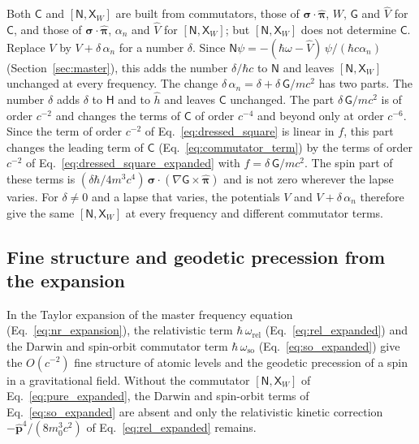 \documentclass[aps,prd,onecolumn,tightenlines,nofootinbib,notitlepage,11pt,floatfix]{revtex4-2}
\theoremstyle{indentedtheorem}
\begin{document}
Both $\mathsf{C}$ and $[\mathsf{N},\mathsf{X}_W]$ are built from commutators, those of $\boldsymbol{\sigma}\cdot\hat{\boldsymbol{\pi}}$, $W$, $\mathsf{G}$ and $\hat{V}$ for $\mathsf{C}$, and those of $\boldsymbol{\sigma}\cdot\hat{\boldsymbol{\pi}}$, $\alpha_n$ and $\hat{V}$ for $[\mathsf{N},\mathsf{X}_W]$; but $[\mathsf{N},\mathsf{X}_W]$ does not determine $\mathsf{C}$. Replace $V$ by $V+\delta\,\alpha_n$ for a number $\delta$. Since $\mathsf{N}\psi=-(\hbar\omega-\hat{V})\,\psi/(\hbar c\alpha_n)$ (Section~\ref{sec:master}), this adds the number $\delta/\hbar c$ to $\mathsf{N}$ and leaves $[\mathsf{N},\mathsf{X}_W]$ unchanged at every frequency. The change $\delta\,\alpha_n=\delta+\delta\,\mathsf{G}/mc^2$ has two parts. The number $\delta$ adds $\delta$ to $\mathsf{H}$ and to $\hat{h}$ and leaves $\mathsf{C}$ unchanged. The part $\delta\,\mathsf{G}/mc^2$ is of order $c^{-2}$ and changes the terms of $\mathsf{C}$ of order $c^{-4}$ and beyond only at order $c^{-6}$. Since the term of order $c^{-2}$ of Eq.~\eqref{eq:dressed_square} is linear in $f$, this part changes the leading term of $\mathsf{C}$ (Eq.~\eqref{eq:commutator_term}) by the terms of order $c^{-2}$ of Eq.~\eqref{eq:dressed_square_expanded} with $f=\delta\,\mathsf{G}/mc^2$. The spin part of these terms is $(\delta\hbar/4m^3c^4)\,\boldsymbol{\sigma}\cdot(\nabla\mathsf{G}\times\hat{\boldsymbol{\pi}})$ and is not zero wherever the lapse varies. For $\delta\neq0$ and a lapse that varies, the potentials $V$ and $V+\delta\,\alpha_n$ therefore give the same $[\mathsf{N},\mathsf{X}_W]$ at every frequency and different commutator terms.

\subsection{Fine structure and geodetic precession from the expansion}
\label{sup:reduction}

In the Taylor expansion of the master frequency equation (Eq.~\eqref{eq:nr_expansion}), the relativistic term $\hbar\,\omega_\text{rel}$ (Eq.~\eqref{eq:rel_expanded}) and the Darwin and spin-orbit commutator term $\hbar\,\omega_\text{so}$ (Eq.~\eqref{eq:so_expanded}) give the $O(c^{-2})$ fine structure of atomic levels and the geodetic precession of a spin in a gravitational field. Without the commutator $[\mathsf{N},\mathsf{X}_W]$ of Eq.~\eqref{eq:pure_expanded}, the Darwin and spin-orbit terms of Eq.~\eqref{eq:so_expanded} are absent and only the relativistic kinetic correction $-\hat{\mathbf{p}}^4/(8m_0^3c^2)$ of Eq.~\eqref{eq:rel_expanded} remains.
\end{document}
